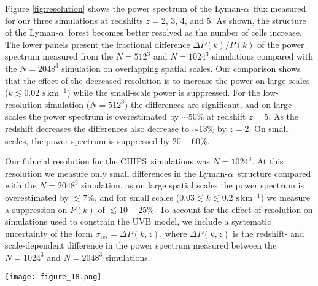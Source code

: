 \documentclass[twocolumn]{aastex62}
\newcommand\Lya{Lyman-$\alpha$}
\newcommand\Sim{CHIPS~}
\newcommand\taueffH{$\tau_{\mathrm{eff,H}}$~}
\begin{document}
Figure \ref{fig:resolution} shows the power spectrum of the \Lya\ flux measured
for our three simulations at redshifts $z=$2, 3, 4, and 5. As shown, the structure 
of the \Lya\ forest becomes better resolved as the number of cells  increase.
The lower panels present the fractional difference $\Delta P(k) /P(k)$ of the power 
spectrum measured from the $N=512^3$ and $N=1024^3$ simulations compared with
the $N=2048^3$ simulation on  overlapping spatial scales. Our comparison 
shows that the effect of the decreased resolution is to increase the power on large scales ($k \lesssim 0.02 \,\, \mathrm{s\, km^{-1}}$) while the small-scale
power is suppressed. For the low-resolution simulation ($N=512^3$) the differences are significant, and
on large scales the power spectrum is overestimated 
by $\sim 50\%$ at redshift $z=5$.
As the redshift decreases
the differences also decrease to $\sim 13\%$ by $z=2$. On small scales, the power 
spectrum is suppressed by $20-60\%$.

Our fiducial resolution for the \Sim simulations was
$N=1024^3$. At this resolution we measure only small
differences in the \Lya\ structure compared with the $N=2048^3$ simulation,
as on large spatial scales the power spectrum is overestimated by $\lesssim 7\%$,
and for small scales ($0.03 \lesssim k \lesssim 0.2 \, \, \mathrm{s \, km^{-1}}$) 
we measure a suppression on $P(k)$ of $\lesssim 10- 25\%$. To account for the effect of
resolution on simulations used to constrain the 
UVB model, we include a systematic uncertainty of
the form $\sigma_\mathrm{res}= \Delta P(k,z)$, where $\Delta P(k,z)$ is the redshift- and
scale-dependent difference in the power 
spectrum measured between the $N=1024^3$ and $N=2048^3$ simulations.  
 

\begin{figure*}
\texttt{[image: figure\_18.png]}
\caption{Consequences of rescaling the effective optical depth
for the power spectrum of the \Lya\
transmitted flux at redshifts
$z=$2, 3, 4, and 5. Shown is
the fractional difference $\Delta P(k) / P(k)$ after rescaling the optical 
depth along the skewer sample from our simulations 
by a constant factor such that $\widetilde{\tau_\mathrm{eff,H}} = ( 1 + \alpha ) \tau_\mathrm{eff}$ 
for $\alpha$ in the range [-3, 3].
Rescaling the optical depth along the skewers 
such that \taueffH increases (decreases) has the effect of increasing (decreasing) $P(k)$.
On scales in the range $0.002 \lesssim k \lesssim 0.1 \,\, \mathrm{s \, km^{-1}}$
the change induced on $P(k)$ is almost uniform, while for the smallest scales
$k \gtrsim 0.1 \,\, \mathrm{s \, km^{-1}}$ the effect is redshift- and scale-dependent.}
\label{fig:rescaled_power_spectrum}
\end{figure*}
\end{document}
